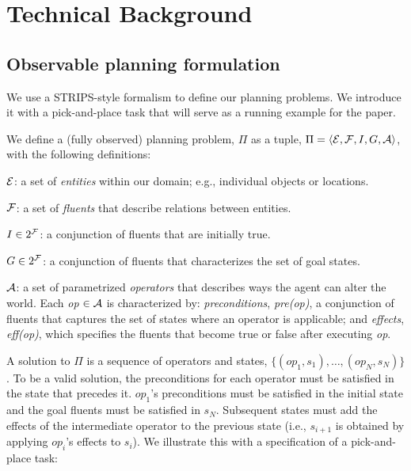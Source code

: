 \section{Technical Background}
\subsection{Observable planning formulation}
\label{sec-formulation}
We use a STRIPS-style formalism to define our planning problems. We
introduce it with a pick-and-place task that will serve as a running
example for the paper.

We define a (fully observed) planning problem, $\Pi$ as a tuple, $\Pi
= \langle \mathcal{E}, \mathcal{F}, I, G, \mathcal{A} \rangle$, with the following definitions:
\begin{tightlist}
\item[$\mathcal{E}$:] a set of \emph{entities} within our domain; e.g., individual objects or locations.
\item[$\mathcal{F}$:] a set of \emph{fluents} that describe relations between
  entities.
\item[$I \in 2^{\mathcal{F}}$:] a conjunction of fluents that are initially true.
\item[$G \in 2^{\mathcal{F}}$:] a conjunction of fluents that characterizes the set of goal states.
\item[$\mathcal{A}$:] a set of parametrized \emph{operators} that describes
  ways the agent can alter the world. Each \emph{op} $\in \mathcal{A}$ is characterized by:
  \emph{preconditions}, \emph{pre(op)}, a conjunction of fluents that captures the set of states where an operator is applicable; and \emph{effects}, \emph{eff(op)}, which specifies the fluents that become true or false after executing \emph{op}.
\end{tightlist}
A solution to $\Pi$ is a sequence of operators and states, $\{(op_1,
s_1),\ldots,(op_N, s_N)\}$. To be a valid solution, the preconditions
for each operator must be satisfied in the state that precedes
it. $op_1$'s preconditions must be satisfied in the initial state and
the goal fluents must be satisfied in $s_N$. Subsequent states must
add the effects of the intermediate operator to the
previous state (i.e., $s_{i+1}$ is obtained by applying $op_i$'s effects to $s_i$). We
illustrate this with a specification of a pick-and-place task:
